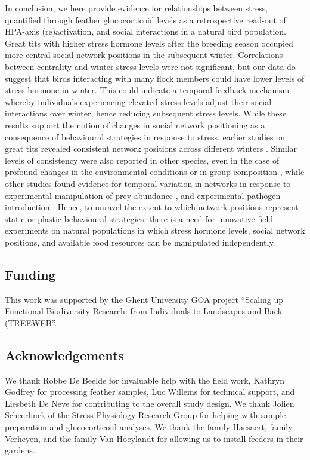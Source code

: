 \documentclass[10pt, twoside]{book} %
\begin{document}
In conclusion, we here provide evidence for relationships between stress, quantified through feather glucocorticoid levels as a retrospective read-out of HPA-axis (re)activation, and social interactions in a natural bird population. Great tits with higher stress hormone levels after the breeding season occupied more central social network positions in the subsequent winter. Correlations between centrality and winter stress levels were not significant, but our data do suggest that birds interacting with many flock members could have lower levels of stress hormone in winter. This could indicate a temporal feedback mechanism whereby individuals experiencing elevated stress levels adjust their social interactions over winter, hence reducing subsequent stress levels. While these results support the notion of changes in social network positioning as a consequence of behavioural strategies in response to stress, earlier studies on great tits revealed consistent network positions across different winters \citep{Aplin2015a}. Similar levels of consistency were also reported in other species, even in the case of profound changes in the environmental conditions or in group composition \citep{Baigger2013, Godfrey2013, Krause2017, Blaszczyk2018}, while other studies found evidence for temporal variation in networks in response to experimental manipulation of prey abundance \citep{StClair2015}, and experimental pathogen introduction \citep{Stroeymeyt2018}. Hence, to unravel the extent to which network positions represent static or plastic behavioural strategies, there is a need for innovative field experiments on natural populations in which stress hormone levels, social network positions, and available food resources can be manipulated independently.\\
\clearpage
	
	\subsection*{Funding}
	
This work was supported by the Ghent University GOA project ``Scaling up Functional Biodiversity Research: from Individuals to Landscapes and Back (TREEWEB''.
	
	\subsection*{Acknowledgements}
	
We thank Robbe De Beelde for invaluable help with the field work, Kathryn Godfrey for processing feather samples, Luc Willems for technical support, and Liesbeth De Neve for contributing to the overall study design. We thank Jolien Scheerlinck of the Stress Physiology Research Group for helping with sample preparation and glucocorticoid analyses. We thank the family Haesaert, family Verheyen, and the family Van Hoeylandt for allowing us to install feeders in their gardens.
	
\end{document}
